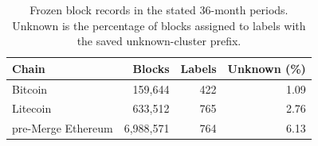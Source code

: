 \begin{table}[!t]
\centering
\footnotesize
\caption{Frozen block records in the stated 36-month periods. Unknown is the percentage of blocks assigned to labels with the saved unknown-cluster prefix.}
\label{tab:compact-data}
\setlength{\tabcolsep}{4pt}
\begin{tabular}{lrrr}
\toprule
Chain & Blocks & Labels & Unknown (\%) \\
\midrule
Bitcoin & 159,644 & 422 & 1.09 \\
Litecoin & 633,512 & 765 & 2.76 \\
pre-Merge Ethereum & 6,988,571 & 764 & 6.13 \\
\bottomrule
\end{tabular}
\end{table}
